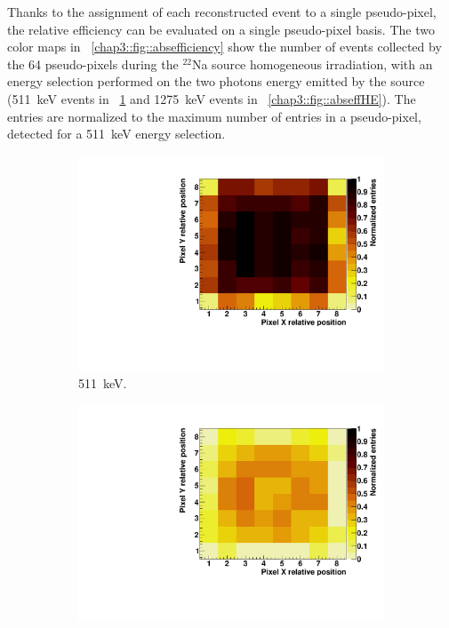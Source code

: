 Thanks to the assignment of each reconstructed event to a single pseudo-pixel, the relative efficiency can be evaluated on a single pseudo-pixel basis. The two color maps in \figurename~\ref{chap3::fig::absefficiency} show the number of events collected by the 64 pseudo-pixels during the $^{22}$Na source homogeneous irradiation, with an energy selection performed on the two photons energy emitted by the source (511~keV events in \figurename~\ref{chap3::fig::abseffLE} and 1275~keV events in \figurename~\ref{chap3::fig::abseffHE}). The entries are normalized to the maximum number of entries in a pseudo-pixel, detected for a 511~keV energy selection.

\begin{figure}
\begin{subfigure}[t]{0.5\textwidth}
\centering
\includegraphics[width=1\textwidth]{03_GraphicFiles/chapter3_CLaRySproto/Absorber/images/eff_map_LE_norm.pdf}
\caption{511~keV.}
\label{chap3::fig::abseffLE}
\end{subfigure}
\begin{subfigure}[t]{0.5\textwidth}
\centering
\includegraphics[width=1\textwidth]{03_GraphicFiles/chapter3_CLaRySproto/Absorber/images/eff_map_HE_norm.pdf}

\end{subfigure}
\end{figure}
